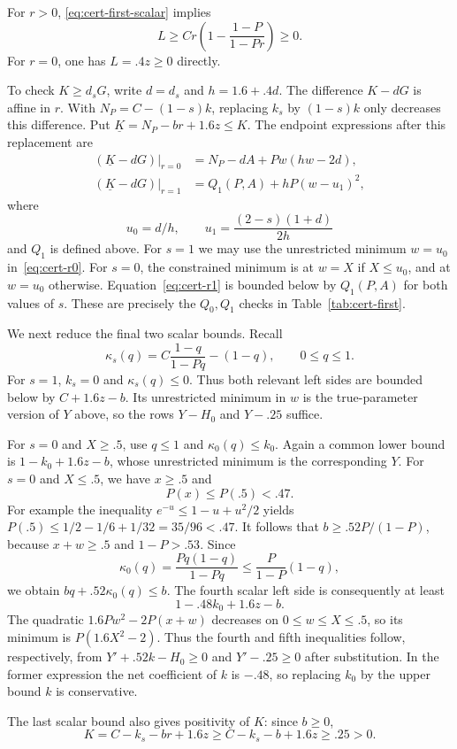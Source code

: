 For $r>0$, \eqref{eq:cert-first-scalar} implies
\[
 L\ge Cr\left(1-\frac{1-P}{1-Pr}\right)\ge0.
\]
For $r=0$, one has $L=.4z\ge0$ directly.

To check $K\ge d_sG$, write $d=d_s$ and $h=1.6+.4d$.
The difference $K-dG$ is affine in $r$.  With
$N_P=C-(1-s)k$, replacing $k_s$ by $(1-s)k$ only decreases this
difference.  Put $\underline K=N_P-br+1.6z\le K$.  The endpoint
expressions after this replacement are
\begin{align}
 (\underline K-dG)|_{r=0}&=N_P-dA+Pw(hw-2d),
 \label{eq:cert-r0}\\
 (\underline K-dG)|_{r=1}&=Q_1(P,A)+hP(w-u_1)^2,
 \label{eq:cert-r1}
\end{align}
where
\[
 u_0=d/h,\qquad u_1=\frac{(2-s)(1+d)}{2h}
\]
and $Q_1$ is defined above.  For $s=1$ we may use the unrestricted
minimum $w=u_0$ in~\eqref{eq:cert-r0}.  For $s=0$, the constrained
minimum is at $w=X$ if $X\le u_0$, and at $w=u_0$ otherwise.
Equation~\eqref{eq:cert-r1} is bounded below by $Q_1(P,A)$ for
both values of $s$.  These are precisely the $Q_0,Q_1$ checks in
Table~\ref{tab:cert-first}.

We next reduce the final two scalar bounds.  Recall
\[
 \kappa_s(q)=C\frac{1-q}{1-Pq}-(1-q),\qquad 0\le q\le1.
\]
For $s=1$, $k_s=0$ and $\kappa_s(q)\le0$.  Thus both relevant
left sides are bounded below by $C+1.6z-b$.  Its unrestricted
minimum in $w$ is the true-parameter version of $Y$ above, so the
rows $Y-H_0$ and $Y-.25$ suffice.

For $s=0$ and $X\ge.5$, use $q\le1$ and $\kappa_0(q)\le k_0$.
Again a common lower bound is $1-k_0+1.6z-b$, whose unrestricted
minimum is the corresponding $Y$.  For $s=0$ and $X\le.5$, we
have $x\ge.5$ and
\[
 P(x)\le P(.5)<.47.
\]
For example the inequality $e^{-u}\le1-u+u^2/2$ yields
$P(.5)\le1/2-1/6+1/32=35/96<.47$.
It follows that $b\ge .52P/(1-P)$, because $x+w\ge.5$ and
$1-P>.53$.  Since
\[
 \kappa_0(q)=\frac{Pq(1-q)}{1-Pq}
       \le\frac{P}{1-P}(1-q),
\]
we obtain $bq+.52\kappa_0(q)\le b$.  The fourth scalar left side
is consequently at least
\[
 1-.48k_0+1.6z-b.
\]
The quadratic $1.6Pw^2-2P(x+w)$ decreases on $0\le w\le X\le.5$,
so its minimum is $P(1.6X^2-2)$.  Thus the fourth and fifth
inequalities follow, respectively, from $Y'+.52k-H_0\ge0$ and
$Y'-.25\ge0$ after substitution.  In the former expression the
net coefficient of $k$ is $-.48$, so replacing $k_0$ by the upper
bound $k$ is conservative.

The last scalar bound also gives positivity of $K$: since $b\ge0$,
\[
 K=C-k_s-br+1.6z\ge C-k_s-b+1.6z\ge.25>0.
\]

